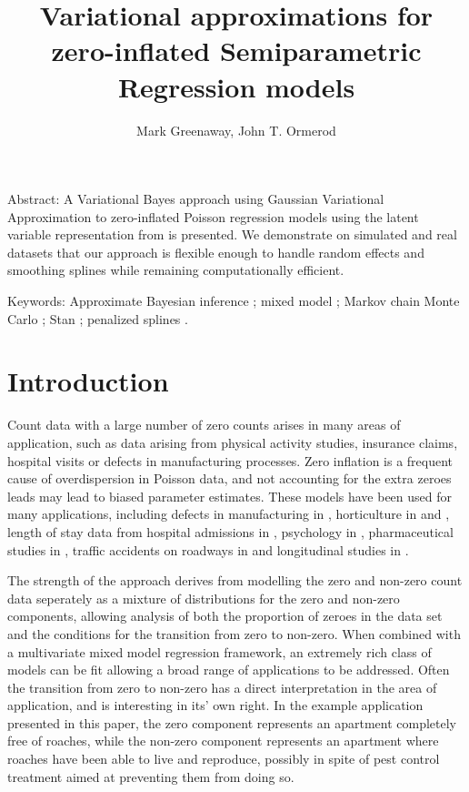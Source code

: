 \documentclass{article}[12pt]
\title{Variational approximations for zero-inflated Semiparametric Regression models}
\author{Mark Greenaway, John T. Ormerod}
\begin{document}
\maketitle

Abstract: A Variational Bayes approach using Gaussian Variational Approximation to zero-inflated Poisson
regression models using the latent variable representation from \cite{Ghosh20061360} is presented. We
demonstrate on simulated and real datasets that our approach is flexible enough to handle random effects and
smoothing splines while remaining computationally efficient.

Keywords: Approximate Bayesian inference ; mixed model ; Markov chain Monte Carlo ; Stan ; 
					penalized splines .

\section{Introduction}
\label{sec:introduction}

Count data with a large number of zero counts arises in many areas of application, such as data arising from
physical activity studies, insurance claims, hospital visits or defects in manufacturing processes. Zero
inflation is a frequent cause of overdispersion in Poisson data, and not accounting for the extra zeroes leads
may lead to biased parameter estimates. These models have been used for many applications, including defects
in manufacturing in \cite{lambert1992}, horticulture in \cite{BIOM:BIOM1030} and \cite{Hall2000}, length of
stay data from hospital admissions in \cite{BIMJ:BIMJ200390024}, psychology in \cite{JOFP:rethink},
pharmaceutical studies in \cite{Min01042005}, traffic accidents on roadways in \cite{Shankar1997829} and
longitudinal studies in \cite{LeeWangScottYauMcLachlan2006}.

The strength of the approach derives from modelling the zero and non-zero count data seperately as a mixture
of distributions for the zero and non-zero components, allowing analysis of both the proportion of zeroes in
the data set and the conditions for the transition from zero to non-zero. When combined with a multivariate
mixed model regression framework, an extremely rich class of models can be fit allowing a broad range of
applications to be addressed. Often the transition from zero to non-zero has a direct interpretation in the
area of application, and is interesting in its' own right. In the example application presented in this paper,
the zero component represents an apartment completely free of roaches, while the non-zero component represents
an apartment where roaches have been able to live and reproduce, possibly in spite of pest control treatment
aimed at preventing them from doing so.
\end{document}

